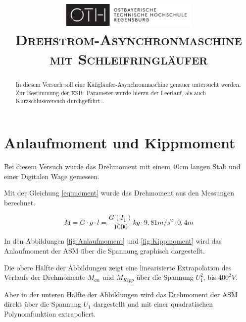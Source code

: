 \documentclass[conference]{IEEEtran}
\begin{document}
\title{
    \centering
    \includegraphics[width=0.5\textwidth]{../OTHR_OTHR_Logo.pdf}\\
    \textsc{Drehstrom-Asynchronmaschine mit Schleifringläufer} \\
}

\maketitle

\begin{abstract}
    In diesem Versuch soll eine Käfigläufer-Asynchronmaschine genauer
    untersucht werden. Zur Bestimmung der ESB- Parameter wurde hierzu der
    Leerlauf, als auch Kurzschlussversuch durchgeführt\dots
\end{abstract}

\section{Anlaufmoment und Kippmoment}

Bei diesem Versuch wurde das Drehmoment mit einem 40cm langen Stab und einer
Digitalen Wage gemessen.

Mit der Gleichung \ref{eq:moment} wurde das Drehmoment aus den Messungen berechnet.

\begin{equation} \label{eq:moment}
    M=G\cdot g\cdot l = \frac{G(I_1)}{1000}\si{kg}\cdot 9,81\si{m/s^2} \cdot 0,4\si{m}
\end{equation}

In den Abbildungen \ref{fig:Anlaufmoment} und \ref{fig:Kippmoment} wird das
Anlaufmoment der ASM über die Spannung graphisch dargestellt.

Die obere Hälfte der Abbildungen zeigt eine linearisierte Extrapolation des
Verlaufs der Drehmomente $M_{an}$ und $M_{\textit{Kipp}}$ über die Spannung
$U_1^2$, bis $400^2V$.

Aber in der unteren Hälfte der Abbildungen wird das Drehmoment der ASM direkt
über die Spannung $U_1$ dargestellt und mit einer quadratischen Polynomfunktion
extrapoliert.


\end{document}
